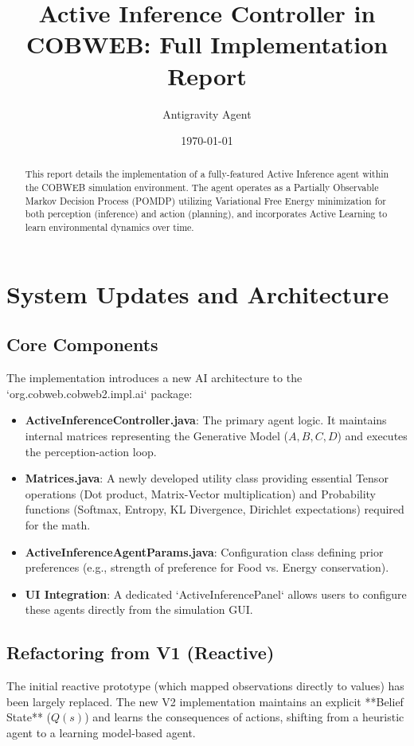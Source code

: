 \documentclass{article}
\title{Active Inference Controller in COBWEB: Full Implementation Report}
\author{Antigravity Agent}
\date{\today}
\begin{document}
\maketitle
\begin{abstract}
This report details the implementation of a fully-featured Active Inference agent within the COBWEB simulation environment. The agent operates as a Partially Observable Markov Decision Process (POMDP) utilizing Variational Free Energy minimization for both perception (inference) and action (planning), and incorporates Active Learning to learn environmental dynamics over time.
\end{abstract}
\section{System Updates and Architecture}
\subsection{Core Components}
The implementation introduces a new AI architecture to the `org.cobweb.cobweb2.impl.ai` package:
\begin{itemize}
    \item \textbf{ActiveInferenceController.java}: The primary agent logic. It maintains internal matrices representing the Generative Model ($A, B, C, D$) and executes the perception-action loop.
    \item \textbf{Matrices.java}: A newly developed utility class providing essential Tensor operations (Dot product, Matrix-Vector multiplication) and Probability functions (Softmax, Entropy, KL Divergence, Dirichlet expectations) required for the math.
    \item \textbf{ActiveInferenceAgentParams.java}: Configuration class defining prior preferences (e.g., strength of preference for Food vs. Energy conservation).
    \item \textbf{UI Integration}: A dedicated `ActiveInferencePanel` allows users to configure these agents directly from the simulation GUI.
\end{itemize}
\subsection{Refactoring from V1 (Reactive)}
The initial reactive prototype (which mapped observations directly to values) has been largely replaced. The new V2 implementation maintains an explicit **Belief State** ($Q(s)$) and learns the consequences of actions, shifting from a heuristic agent to a learning model-based agent.
\end{document}
